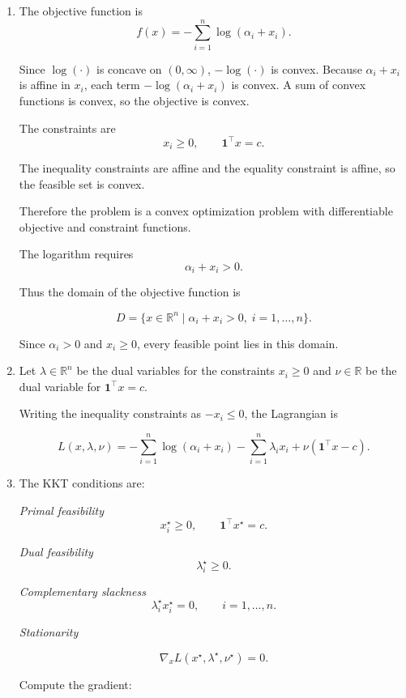 \documentclass[
	12pt,
]{fphw}
\begin{document}
\begin{enumerate}

\item[(a)]

The objective function is
\[
f(x)=-\sum_{i=1}^n \log(\alpha_i+x_i).
\]

Since $\log(\cdot)$ is concave on $(0,\infty)$, $-\log(\cdot)$ is convex.
Because $\alpha_i+x_i$ is affine in $x_i$, each term $-\log(\alpha_i+x_i)$ is convex.
A sum of convex functions is convex, so the objective is convex.

The constraints are
\[
x_i\ge0, \qquad \mathbf{1}^\top x=c.
\]

The inequality constraints are affine and the equality constraint is affine,
so the feasible set is convex.

Therefore the problem is a convex optimization problem with differentiable
objective and constraint functions.

The logarithm requires
\[
\alpha_i+x_i>0.
\]

Thus the domain of the objective function is

\[
D=\{x\in\mathbb{R}^n \mid \alpha_i+x_i>0,\; i=1,\ldots,n\}.
\]

Since $\alpha_i>0$ and $x_i\ge0$, every feasible point lies in this domain.

\item[(b)]

Let $\lambda\in\mathbb{R}^n$ be the dual variables for the constraints
$x_i\ge0$ and $\nu\in\mathbb{R}$ be the dual variable for
$\mathbf{1}^\top x=c$.

Writing the inequality constraints as $-x_i\le0$, the Lagrangian is

\[
L(x,\lambda,\nu)
=
-\sum_{i=1}^n \log(\alpha_i+x_i)
-\sum_{i=1}^n \lambda_i x_i
+\nu(\mathbf{1}^\top x-c).
\]

\item[(c)]

The KKT conditions are:

\textit{Primal feasibility}
\[
x_i^\star \ge 0, \qquad \mathbf{1}^\top x^\star=c.
\]

\textit{Dual feasibility}
\[
\lambda_i^\star \ge 0.
\]

\textit{Complementary slackness}
\[
\lambda_i^\star x_i^\star=0, \qquad i=1,\ldots,n.
\]

\textit{Stationarity}

\[
\nabla_x L(x^\star,\lambda^\star,\nu^\star)=0.
\]

Compute the gradient:


\end{enumerate}
\end{document}
